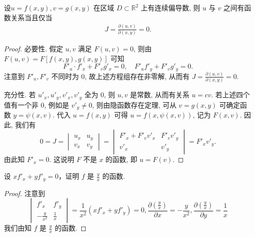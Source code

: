 \documentclass[../../main.tex]{subfiles}
\begin{document}
\begin{theorem}\label{theorem:定理雅克比行列式为0的充要条件}
设\( u = f(x, y), v = g(x, y) \) 在区域 \( D \subset \mathbb{R}^2 \) 上有连续偏导数, 则 \( u \) 与 \( v \) 之间有函数关系当且仅当
\begin{align*}
J = \frac{\partial (u, v)}{\partial (x, y)} = 0.
\end{align*}
\end{theorem}
\begin{proof}
必要性. 假定 \( u, v \) 满足 \( F(u, v) = 0 \), 则由 \( F(u, v) = F[f(x, y), g(x, y)] \) 可知
\[
F'_u \cdot f'_x + F'_v g'_x = 0, \quad F'_u f'_y + F'_v g'_y = 0.
\]
注意到 \( F'_u, F'_v \) 不同时为 0, 故上述方程组存在非零解, 从而有 \( J = \frac{\partial (u, v)}{\partial (x, y)} = 0 \).

充分性. 若 \( u'_x, u'_y, v'_x, v'_y \) 全为 0, 则 \( u, v \) 是常数, 从而有关系 \( u = cv \). 若上述四个值有一个非 0, 例如是 \( v'_y \neq 0 \), 则由隐函数存在定理, 可从 \( v = g(x, y) \) 可确定函数 \( y = \psi(x, v) \). 代入 \( u = f(x, y) \) 可得 \( u = f(x, \psi(x, v)) \), 记为 \( F(x, v) \).
因此, 我们有
\[
0 = J = \begin{vmatrix}
u_x & u_y \\
v_x & v_y
\end{vmatrix} = \begin{vmatrix}
F'_x + F'_v v'_x & F'_v v'_y \\
v'_x & v'_y
\end{vmatrix} = F'_x v'_y.
\]
由此知 \( F'_x = 0 \). 这说明 \( F \) 不是 \( x \) 的函数, 即 \( u = F(v) \).

\end{proof}

\begin{example}
设 \( x f'_x + y f'_y = 0 \)，证明 \( f \) 是 \( \frac{y}{x} \) 的函数.
\end{example}
\begin{proof}
注意到
\[
\begin{vmatrix}
f'_x & f'_y \\
-\frac{y}{x^2} & \frac{1}{x}
\end{vmatrix} = \frac{1}{x^2} \left( x f'_x + y f'_y \right) = 0, \frac{\partial \left( \frac{y}{x} \right)}{\partial x} = -\frac{y}{x^2}, \frac{\partial \left( \frac{y}{x} \right)}{\partial y} = \frac{1}{x}
\]
我们由知 \( f \) 是 \( \frac{y}{x} \) 的函数.

\end{proof}
\end{document}
